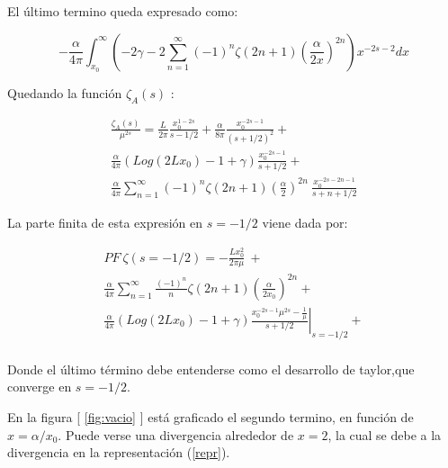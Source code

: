 El último termino queda expresado como:

\begin{equation}
- \frac{\alpha}{4 \pi}
\int _{x_0} ^{\infty}
\left(
-2 \gamma -
2 \sum _{n=1} ^{\infty} 
(-1) ^{n}
\zeta (2n+1) 
\left( \frac{\alpha}{2 x} \right) ^{2n}
\right)
x ^{-2s-2} dx
\end{equation}

Quedando la función $\zeta _A (s) $ :

\begin{equation}
\begin{array}{c}
\frac{\zeta _A (s)}{\mu ^{2s}} = 
\frac{L  }{2 \pi } \frac{ x _0 ^{1-2s} }{s- 1/2} + 
\frac{\alpha  }{8 \pi } \frac{ x_0 ^{-2s-1} }{(s+1/2) ^2} + \\[10pt]


\frac{\alpha  }{4 \pi } 
\left(
Log(2 L x _0 ) -1 + \gamma 
\right)
\frac{x _0 ^{-2s-1}}{s+1/2} + \\[10pt]


\frac{\alpha }{4\pi} 
\sum _{n=1} ^{\infty} (-1) ^{n} \zeta (2n+1) 
( \frac{\alpha}{2 } ) ^{2n} \ \frac{x _0 ^{-2s-2n-1}}{s+n+1/2}
\end{array}
\end{equation}

La parte finita de esta expresión en $s=-1/2$ viene dada por:

\begin{equation}
\begin{array}{c}

PF \ \zeta (s=-1/2) = 

- \frac{L x_0 ^2}{2 \pi \mu} \ + \\[10pt]

\frac{\alpha}{4 \pi} 
						\sum _{n=1} ^{\infty} \frac{(-1) ^n}{n} \zeta (2n+1)
						\left( \frac{\alpha}{2 x_0 } \right) ^{2n}  + \\[10pt]

\frac{\alpha  }{4 \pi } 
\left(
Log(2 L x _0 ) -1 + \gamma 
\right)
\left. \frac{ x _0 ^{-2s-1} \mu ^{2s} -  \frac{1}{\mu}  }{s+1/2} \right| _{s=-1/2}  + \\[10pt]

					

\end{array}
\end{equation}

Donde el último término debe entenderse como el desarrollo de taylor,que converge en $s=-1/2$.


En la figura [ \ref{fig:vacio} ] está graficado el segundo termino, en función de $x = \alpha / x_0$. Puede verse una divergencia alrededor de $x=2$, la cual se debe a la divergencia en la representación (\ref{repr}).

